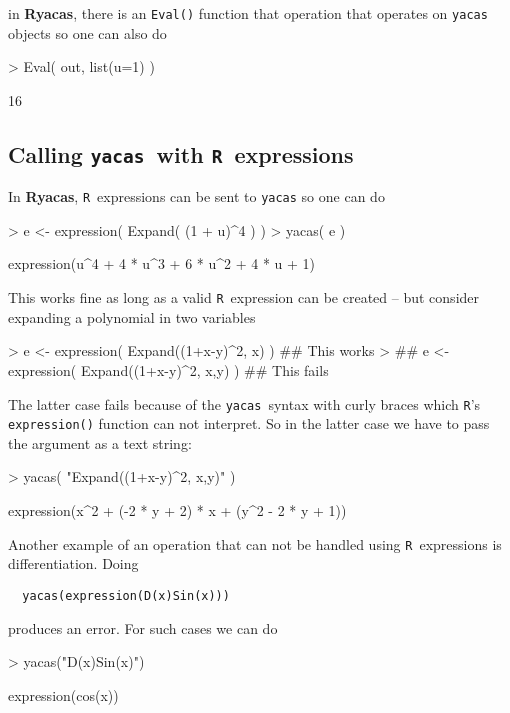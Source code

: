 \documentclass[10pt]{article}
\newcommand{\ryacas}{{\bf Ryacas}}
\newcommand{\yacas}{{\tt yacas}}
\newcommand{\code}[1]{{\tt #1}}
\def\R{\texttt{R}}
\begin{document}
in \ryacas, there is an \code{Eval()} function that operation that
operates on \verb'yacas' objects so one can also do
\begin{Schunk}
\begin{Sinput}
> Eval( out, list(u=1) )
\end{Sinput}
\begin{Soutput}
[1] 16
\end{Soutput}
\end{Schunk}

\subsection{Calling \yacas\ with \R\ expressions}
\label{sec:calling-yacas-with}

In \ryacas, \R\ expressions can be sent to \code{yacas} so one can do
\begin{Schunk}
\begin{Sinput}
> e <- expression( Expand( (1 + u)^4 ) )
> yacas( e )
\end{Sinput}
\begin{Soutput}
expression(u^4 + 4 * u^3 + 6 * u^2 + 4 * u + 1)
\end{Soutput}
\end{Schunk}

This works fine as long as a valid \R\ expression can be
created -- but consider expanding a polynomial in two variables
\begin{Schunk}
\begin{Sinput}
> e <- expression( Expand((1+x-y)^2, x) )         ## This works
> ## e <- expression( Expand((1+x-y)^2, {x,y}) )  ## This fails
\end{Sinput}
\end{Schunk}
The latter case fails because of the \yacas\ syntax with curly braces
which \R's \code{expression()} function can not interpret. So in the
latter case we have to pass the argument as a text string:
\begin{Schunk}
\begin{Sinput}
> yacas( "Expand((1+x-y)^2, {x,y})" )
\end{Sinput}
\begin{Soutput}
expression(x^2 + (-2 * y + 2) * x + (y^2 - 2 * y + 1))
\end{Soutput}
\end{Schunk}

Another example of an operation that can not be handled using \R\
expressions is differentiation. Doing
\begin{verbatim}
  yacas(expression(D(x)Sin(x)))
\end{verbatim}
produces an error. For such cases we can do
\begin{Schunk}
\begin{Sinput}
> yacas("D(x)Sin(x)")
\end{Sinput}
\begin{Soutput}
expression(cos(x))
\end{Soutput}
\end{Schunk}
\end{document}
